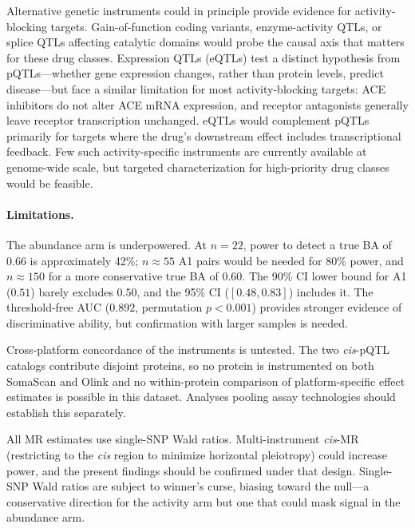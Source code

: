 \documentclass[11pt]{article}
\begin{document}
Alternative genetic instruments could in principle provide evidence for activity-blocking targets. Gain-of-function coding variants, enzyme-activity QTLs, or splice QTLs affecting catalytic domains would probe the causal axis that matters for these drug classes. Expression QTLs (eQTLs) test a distinct hypothesis from pQTLs---whether gene expression changes, rather than protein levels, predict disease---but face a similar limitation for most activity-blocking targets: ACE inhibitors do not alter ACE mRNA expression, and receptor antagonists generally leave receptor transcription unchanged. eQTLs would complement pQTLs primarily for targets where the drug's downstream effect includes transcriptional feedback. Few such activity-specific instruments are currently available at genome-wide scale, but targeted characterization for high-priority drug classes would be feasible.

\paragraph{Limitations.}
The abundance arm is underpowered. At $n = 22$, power to detect a true BA of $0.66$ is approximately 42\%; $n \approx 55$ A1 pairs would be needed for 80\% power, and $n \approx 150$ for a more conservative true BA of $0.60$. The 90\% CI lower bound for A1 ($0.51$) barely excludes $0.50$, and the 95\% CI ($[0.48, 0.83]$) includes it. The threshold-free AUC ($0.892$, permutation $p < 0.001$) provides stronger evidence of discriminative ability, but confirmation with larger samples is needed.

Cross-platform concordance of the instruments is untested. The two \emph{cis}-pQTL catalogs contribute disjoint proteins, so no protein is instrumented on both SomaScan and Olink and no within-protein comparison of platform-specific effect estimates is possible in this dataset. Analyses pooling assay technologies should establish this separately.

All MR estimates use single-SNP Wald ratios. Multi-instrument \emph{cis}-MR (restricting to the \emph{cis} region to minimize horizontal pleiotropy) could increase power, and the present findings should be confirmed under that design. Single-SNP Wald ratios are subject to winner's curse, biasing toward the null---a conservative direction for the activity arm but one that could mask signal in the abundance arm.
\end{document}
